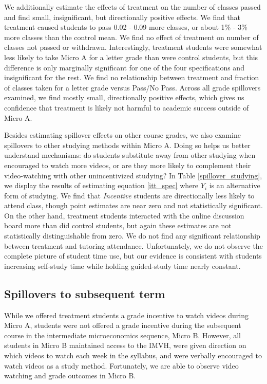 \documentclass[12pt]{article}
\begin{document}
We additionally estimate the effects of treatment on the number of classes passed and find small, insignificant, but directionally positive effects. We find that treatment caused students to pass 0.02 - 0.09 more classes, or about 1\% - 3\% more classes than the control mean. We find no effect of treatment on number of classes not passed or withdrawn. Interestingly, treatment students were somewhat less likely to take Micro A for a letter grade than were control students, but this difference is only marginally significant for one of the four specifications and insignificant for the rest. We find no relationship between treatment and fraction of classes taken for a letter grade versus Pass/No Pass. Across all grade spillovers examined, we find mostly small, directionally positive effects, which gives us confidence that treatment is likely not harmful to academic success outside of Micro A.

Besides estimating spillover effects on other course grades, we also examine spillovers to other studying methods within Micro A. Doing so helps us better understand mechanisms: do students substitute away from other studying when encouraged to watch more videos, or are they more likely to complement their video-watching with other unincentivized studying? In Table \ref{spillover_studying}, we display the results of estimating equation \ref{itt_spec} where $Y_i$ is an alternative form of studying. We find that \textit{Incentive} students are directionally less likely to attend class, though point estimates are near zero and not statistically significant. On the other hand, treatment students interacted with the online discussion board more than did control students, but again these estimates are not statistically distinguishable from zero. We do not find any significant relationship between treatment and tutoring attendance. Unfortunately, we do not observe the complete picture of student time use, but our evidence is consistent with students increasing self-study time while holding guided-study time nearly constant.

\subsection{Spillovers to subsequent term}

While we offered treatment students a grade incentive to watch videos during Micro A, students were not offered a grade incentive during the subsequent course in the intermediate microeconomics sequence, Micro B. However, all students in Micro B maintained access to the IMVH, were given direction on which videos to watch each week in the syllabus, and were verbally encouraged to watch videos as a study method. Fortunately, we are able to observe video watching and grade outcomes in Micro B.
\end{document}

